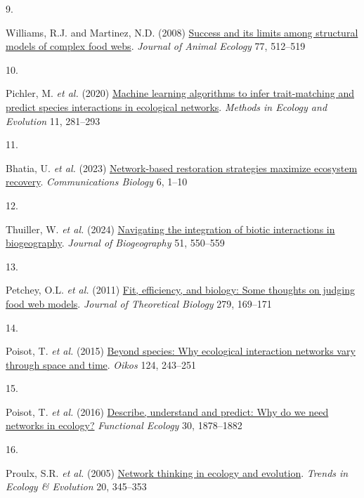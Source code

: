 \documentclass[
]{article}
\newlength{\cslhangindent}
\newlength{\csllabelwidth}
\newenvironment{CSLReferences}[2] %
 {\begin{list}{}{%
  \setlength{\itemindent}{0pt}
  \setlength{\leftmargin}{0pt}
  \setlength{\parsep}{0pt}
  \ifodd #1
   \setlength{\leftmargin}{\cslhangindent}
   \setlength{\itemindent}{-1\cslhangindent}
  \fi
  \setlength{\itemsep}{#2\baselineskip}}}
 {\end{list}}
\newcommand{\CSLLeftMargin}[1]{\parbox[t]{\csllabelwidth}{\strut#1\strut}}
\newcommand{\CSLRightInline}[1]{\parbox[t]{\linewidth - \csllabelwidth}{\strut#1\strut}}
\begin{document}
\begin{CSLReferences}{0}{0}
\CSLLeftMargin{9. }%
\CSLRightInline{Williams, R.J. and Martinez, N.D. (2008)
\href{https://doi.org/10.1111/j.1365-2656.2008.01362.x}{Success and its
limits among structural models of complex food webs}. \emph{Journal of
Animal Ecology} 77, 512--519}

\CSLLeftMargin{10. }%
\CSLRightInline{Pichler, M. \emph{et al.} (2020)
\href{https://doi.org/10.1111/2041-210X.13329}{Machine learning
algorithms to infer trait-matching and predict species interactions in
ecological networks}. \emph{Methods in Ecology and Evolution} 11,
281--293}

\CSLLeftMargin{11. }%
\CSLRightInline{Bhatia, U. \emph{et al.} (2023)
\href{https://doi.org/10.1038/s42003-023-05622-3}{Network-based
restoration strategies maximize ecosystem recovery}.
\emph{Communications Biology} 6, 1--10}

\CSLLeftMargin{12. }%
\CSLRightInline{Thuiller, W. \emph{et al.} (2024)
\href{https://doi.org/10.1111/jbi.14734}{Navigating the integration of
biotic interactions in biogeography}. \emph{Journal of Biogeography} 51,
550--559}

\CSLLeftMargin{13. }%
\CSLRightInline{Petchey, O.L. \emph{et al.} (2011)
\href{https://doi.org/10.1016/j.jtbi.2011.03.019}{Fit, efficiency, and
biology: {Some} thoughts on judging food web models}. \emph{Journal of
Theoretical Biology} 279, 169--171}

\CSLLeftMargin{14. }%
\CSLRightInline{Poisot, T. \emph{et al.} (2015)
\href{https://doi.org/10.1111/oik.01719}{Beyond species: Why ecological
interaction networks vary through space and time}. \emph{Oikos} 124,
243--251}

\CSLLeftMargin{15. }%
\CSLRightInline{Poisot, T. \emph{et al.} (2016)
\href{https://www.jstor.org/stable/48582345}{Describe, understand and
predict: Why do we need networks in ecology?} \emph{Functional Ecology}
30, 1878--1882}

\CSLLeftMargin{16. }%
\CSLRightInline{Proulx, S.R. \emph{et al.} (2005)
\href{https://doi.org/10.1016/j.tree.2005.04.004}{Network thinking in
ecology and evolution}. \emph{Trends in Ecology \& Evolution} 20,
345--353}


\end{CSLReferences}
\end{document}
